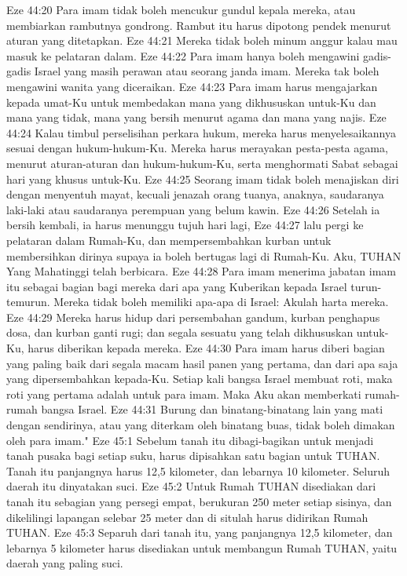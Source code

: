 Eze 44:20  Para imam tidak boleh mencukur gundul kepala mereka, atau membiarkan rambutnya gondrong. Rambut itu harus dipotong pendek menurut aturan yang ditetapkan.
Eze 44:21  Mereka tidak boleh minum anggur kalau mau masuk ke pelataran dalam.
Eze 44:22  Para imam hanya boleh mengawini gadis-gadis Israel yang masih perawan atau seorang janda imam. Mereka tak boleh mengawini wanita yang diceraikan.
Eze 44:23  Para imam harus mengajarkan kepada umat-Ku untuk membedakan mana yang dikhususkan untuk-Ku dan mana yang tidak, mana yang bersih menurut agama dan mana yang najis.
Eze 44:24  Kalau timbul perselisihan perkara hukum, mereka harus menyelesaikannya sesuai dengan hukum-hukum-Ku. Mereka harus merayakan pesta-pesta agama, menurut aturan-aturan dan hukum-hukum-Ku, serta menghormati Sabat sebagai hari yang khusus untuk-Ku.
Eze 44:25  Seorang imam tidak boleh menajiskan diri dengan menyentuh mayat, kecuali jenazah orang tuanya, anaknya, saudaranya laki-laki atau saudaranya perempuan yang belum kawin.
Eze 44:26  Setelah ia bersih kembali, ia harus menunggu tujuh hari lagi,
Eze 44:27  lalu pergi ke pelataran dalam Rumah-Ku, dan mempersembahkan kurban untuk membersihkan dirinya supaya ia boleh bertugas lagi di Rumah-Ku. Aku, TUHAN Yang Mahatinggi telah berbicara.
Eze 44:28  Para imam menerima jabatan imam itu sebagai bagian bagi mereka dari apa yang Kuberikan kepada Israel turun-temurun. Mereka tidak boleh memiliki apa-apa di Israel: Akulah harta mereka.
Eze 44:29  Mereka harus hidup dari persembahan gandum, kurban penghapus dosa, dan kurban ganti rugi; dan segala sesuatu yang telah dikhususkan untuk-Ku, harus diberikan kepada mereka.
Eze 44:30  Para imam harus diberi bagian yang paling baik dari segala macam hasil panen yang pertama, dan dari apa saja yang dipersembahkan kepada-Ku. Setiap kali bangsa Israel membuat roti, maka roti yang pertama adalah untuk para imam. Maka Aku akan memberkati rumah-rumah bangsa Israel.
Eze 44:31  Burung dan binatang-binatang lain yang mati dengan sendirinya, atau yang diterkam oleh binatang buas, tidak boleh dimakan oleh para imam."
Eze 45:1  Sebelum tanah itu dibagi-bagikan untuk menjadi tanah pusaka bagi setiap suku, harus dipisahkan satu bagian untuk TUHAN. Tanah itu panjangnya harus 12,5 kilometer, dan lebarnya 10 kilometer. Seluruh daerah itu dinyatakan suci.
Eze 45:2  Untuk Rumah TUHAN disediakan dari tanah itu sebagian yang persegi empat, berukuran 250 meter setiap sisinya, dan dikelilingi lapangan selebar 25 meter dan di situlah harus didirikan Rumah TUHAN.
Eze 45:3  Separuh dari tanah itu, yang panjangnya 12,5 kilometer, dan lebarnya 5 kilometer harus disediakan untuk membangun Rumah TUHAN, yaitu daerah yang paling suci.
